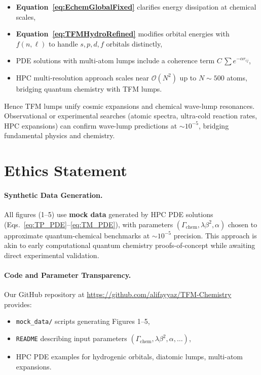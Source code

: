 \documentclass[12pt]{article}
\begin{document}
\begin{itemize}
  \item \textbf{Equation~\eqref{eq:EchemGlobalFixed}} clarifies energy dissipation at chemical scales,
  \item \textbf{Equation~\eqref{eq:TFMHydroRefined}} modifies orbital energies with $f(n,\ell)$ to handle $s,p,d,f$ orbitals distinctly,
  \item PDE solutions with multi-atom lumps include a coherence term $C\,\sum e^{-\alpha r_{ij}}$,
  \item HPC multi-resolution approach scales near $\mathcal{O}(N^2)$ up to $N\sim500$ atoms, bridging quantum chemistry with TFM lumps.
\end{itemize}
Hence TFM lumps unify cosmic expansions and chemical wave-lump resonances. Observational or experimental searches (atomic spectra, ultra-cold reaction rates, HPC expansions) can confirm wave-lump predictions at $\sim10^{-5}$, bridging fundamental physics and chemistry.

\vspace{1em}

\section*{Ethics Statement}
\label{sec:ethics}

\paragraph{Synthetic Data Generation.}
All figures (1--5) use \textbf{mock data} generated by HPC PDE solutions (Eqs.~\eqref{eq:TP_PDE}--\eqref{eq:TM_PDE}), with parameters $(\Gamma_{\mathrm{chem}},\lambda\beta^2,\alpha)$ chosen to approximate quantum-chemical benchmarks at $\sim10^{-5}$ precision. This approach is akin to early computational quantum chemistry proofs-of-concept while awaiting direct experimental validation.

\paragraph{Code and Parameter Transparency.}
Our GitHub repository at \url{https://github.com/alifayyaz/TFM-Chemistry} provides:
\begin{itemize}
  \item \texttt{mock\_data/} scripts generating Figures 1--5,
  \item \texttt{README} describing input parameters $(\Gamma_{\mathrm{chem}},\lambda\beta^2,\alpha,\dots)$,
  \item HPC PDE examples for hydrogenic orbitals, diatomic lumps, multi-atom expansions.
\end{itemize}
\end{document}
